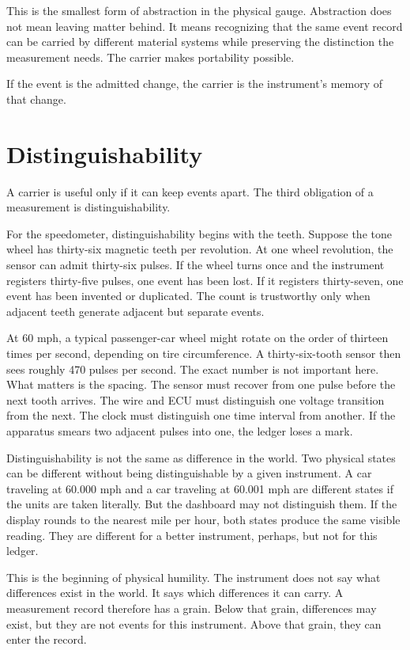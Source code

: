 This is the smallest form of abstraction in the physical gauge. Abstraction
does not mean leaving matter behind. It means recognizing that the same event
record can be carried by different material systems while preserving the
distinction the measurement needs. The carrier makes portability possible.

If the event is the admitted change, the carrier is the instrument's memory of
that change.

\section{Distinguishability}
\label{se:distinguishability}

A carrier is useful only if it can keep events apart. The third obligation of a
measurement is distinguishability.

For the speedometer, distinguishability begins with the teeth. Suppose the tone
wheel has thirty-six magnetic teeth per revolution. At one wheel revolution,
the sensor can admit thirty-six pulses. If the wheel turns once and the
instrument registers thirty-five pulses, one event has been lost. If it
registers thirty-seven, one event has been invented or duplicated. The count is
trustworthy only when adjacent teeth generate adjacent but separate events.

At 60 mph, a typical passenger-car wheel might rotate on the order of thirteen
times per second, depending on tire circumference. A thirty-six-tooth sensor
then sees roughly 470 pulses per second. The exact number is not important here.
What matters is the spacing. The sensor must recover from one pulse before the
next tooth arrives. The wire and ECU must distinguish one voltage transition
from the next. The clock must distinguish one time interval from another. If the
apparatus smears two adjacent pulses into one, the ledger loses a mark.

Distinguishability is not the same as difference in the world. Two physical
states can be different without being distinguishable by a given instrument. A
car traveling at 60.000 mph and a car traveling at 60.001 mph are different
states if the units are taken literally. But the dashboard may not distinguish
them. If the display rounds to the nearest mile per hour, both states produce
the same visible reading. They are different for a better instrument, perhaps,
but not for this ledger.

This is the beginning of physical humility. The instrument does not say what
differences exist in the world. It says which differences it can carry. A
measurement record therefore has a grain. Below that grain, differences may
exist, but they are not events for this instrument. Above that grain, they can
enter the record.

